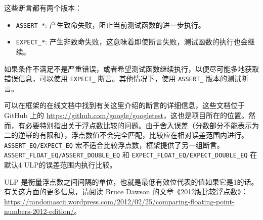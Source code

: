 
这些断言都有两个版本：

\begin{itemize}
\item
\verb|ASSERT_*|: 产生致命失败，阻止当前测试函数的进一步执行。

\item
\verb|EXPECT_*|: 产生非致命失败，这意味着即使断言失败，测试函数的执行也会继续。
\end{itemize}

如果条件不满足不是严重错误，或者希望测试函数继续执行，以便尽可能多地获取错误信息，可以使用 \verb|EXPECT_| 断言。其他情况下，使用 \verb|ASSERT_| 版本的测试断言。

可以在框架的在线文档中找到有关这里介绍的断言的详细信息，这些文档位于 GitHub 上的 \url{https://github.com/google/googletest}，这也是项目所在的位置。然而，有必要特别指出关于浮点数比较的问题。由于舍入误差（分数部分不能表示为二的逆幂的有限和），浮点数值不会完全匹配，比较应在相对误差范围内进行。\verb|ASSERT_EQ/EXPECT_EQ| 宏不适合比较浮点数，框架提供了另一组断言。\verb|ASSERT_FLOAT_EQ/ASSERT_DOUBLE_EQ| 和 \verb|EXPECT_FLOAT_EQ/EXPECT_DOUBLE_EQ| 在默认4 ULP的误差范围内执行比较。

\begin{myTip}
ULP 是衡量浮点数之间间隔的单位，也就是最低有效位代表的值如果它是1的话。有关这方面的更多信息，请阅读 Bruce Dawson 的文章《2012版比较浮点数》：\url{https://randomascii.wordpress.com/2012/02/25/comparing-floating-point-numbers-2012-edition/}。
\end{myTip}



